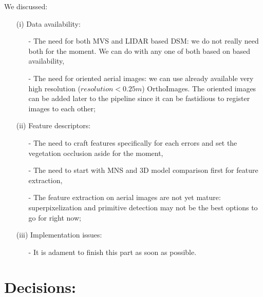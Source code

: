 \documentclass[a4paper, 11pt]{article}
\begin{document}
	We discussed: 
	\begin{itemize}
		\item[(i)] Data availability:
		\begin{itemize}
			\item[-] The need for both MVS and LIDAR based DSM: we do not really need both for the moment. We can do with any one of both based on based availability,
			\item[-] The need for oriented aerial images: we can use already available very high resolution ($resolution<0.25m$) OrthoImages. The oriented images can be added later to the pipeline since it can be fastidious to register images to each other;
		\end{itemize}
		\item[(ii)] Feature descriptors:
		\begin{itemize}
			\item[-] The need to craft features specifically for each errors and set the vegetation occlusion aside for the moment,
			\item[-] The need to start with MNS and 3D model comparison first for feature extraction,
			\item[-] The feature extraction on aerial images are not yet mature: superpixelization and primitive detection may not be the best options to go for right now;
		\end{itemize}
		\item[(iii)] Implementation issues:
		\begin{itemize}
			\item[-] It is adament to finish this part as soon as possible.
		\end{itemize}
	\end{itemize}
	
	\section*{Decisions:}
	
\end{document}
